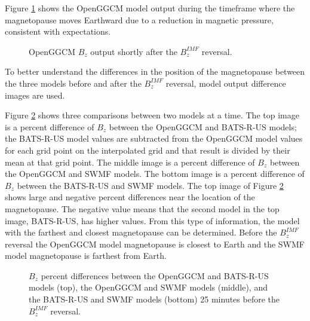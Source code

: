 Figure \ref{fig:OpenGGCMatReversal} shows the OpenGGCM model output during the timeframe
where the magnetopause moves Earthward due
to a reduction in magnetic pressure, consistent with expectations. 
\begin{figure}
	\centering
	\caption{OpenGGCM $B_z$ output shortly after the $B_z^{IMF}$ reversal.}
	\figSpace
	\label{fig:OpenGGCMatReversal}
\end{figure}

To better understand the differences in the position of the magnetopause
between the three models before and after the $B_z^{IMF}$ reversal,
model output difference images are used.

Figure \ref{fig:BdiffBeforeFlip} shows three comparisons between two models at a
time. The top image is a percent difference of $B_z$ between the OpenGGCM and
BATS-R-US models; the BATS-R-US model values are subtracted from the OpenGGCM model
values for each grid point on the interpolated grid and that result is
divided by their mean at that grid point. The middle image is a percent difference of $B_z$ between
the OpenGGCM and SWMF models. The bottom image is a percent difference of $B_z$
between the BATS-R-US and SWMF models. The top image of Figure \ref{fig:BdiffBeforeFlip}
shows large and negative percent differences near the location of the magnetopause. The negative value means that the second model in the top image, BATS-R-US, has
higher values. From this type of information, the model with the farthest and
closest magnetopause can be determined. Before the $B_z^{IMF}$ reversal the OpenGGCM model
magnetopause is closest to Earth and the SWMF model magnetopause is farthest
from Earth.
\begin{figure}
	\centering
	\caption{$B_z$ percent differences between the OpenGGCM and
	BATS-R-US models (top), the OpenGGCM and SWMF models (middle), and the BATS-R-US
	and SWMF models (bottom) 25 minutes before the $B_z^{IMF}$ reversal.}
	\figSpace
	\label{fig:BdiffBeforeFlip}
\end{figure}


